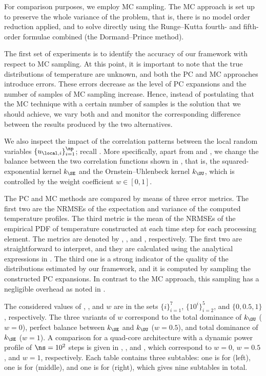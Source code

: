 For comparison purposes, we employ \ac{MC} sampling. The \ac{MC} approach is set
up to preserve the whole variance of the problem, that is, there is no model
order reduction applied, and to solve  directly
using the Runge--Kutta fourth- and fifth-order formulae combined (the
Dormand--Prince method).


The first set of experiments is to identify the accuracy of our framework with
respect to \ac{MC} sampling. At this point, it is important to note that the
true distributions of temperature are unknown, and both the \ac{PC} and \ac{MC}
approaches introduce errors. These errors decrease as the level \lc of \ac{PC}
expansions and the number of samples \no of \ac{MC} sampling increase. Hence,
instead of postulating that the \ac{MC} technique with a certain number of
samples is the solution that we should achieve, we vary both \lc and \no and
monitor the corresponding difference between the results produced by the two
alternatives.

We also inspect the impact of the correlation patterns between the local random
variables $\{ u_{\local, i} \}_{i = 1}^\np$; recall
. More specifically, apart from \lc and \no,
we change the balance between the two correlation functions shown in
, that is, the squared-exponential kernel $k_\SE$
and the Ornstein--Uhlenbeck kernel $k_\OU$, which is controlled by the weight
coefficient $w \in [0, 1]$.

The \ac{PC} and \ac{MC} methods are compared by means of three error metrics.
The first two are the \acp{NRMSE} of the expectation and variance of the
computed temperature profiles. The third metric is the mean of the \acp{NRMSE}
of the empirical \ac{PDF} of temperature constructed at each time step for each
processing element. The metrics are denoted by \error{\expectation},
\error{\variance}, and , respectively. The first two are
straightforward to interpret, and they are calculated using the analytical
expressions in . The third one is a strong indicator of the
quality of the distributions estimated by our framework, and it is computed by
sampling the constructed \ac{PC} expansions. In contrast to the \ac{MC}
approach, this sampling has a negligible overhead as noted in
.

The considered values of \lc, \no, and $w$ are in the sets $\{ i \}_{i = 1}^7$,
$\{ 10^i \}_{i = 2}^5$, and $\{ 0, 0.5, 1 \}$, respectively. The three variants
of $w$ correspond to the total dominance of $k_\OU$ ($w = 0$), perfect balance
between $k_\SE$ and $k_\OU$ ($w = 0.5$), and total dominance of $k_\SE$ ($w =
1$). A comparison for a quad-core architecture with a dynamic power profile of
$\ns = 10^2$ steps is given in ,
, and ,
which correspond to $w = 0$, $w = 0.5$, and $w = 1$, respectively. Each table
contains three subtables: one is for \error{\expectation} (left), one is for
\error{\variance} (middle), and one is for  (right), which gives nine
subtables in total.

